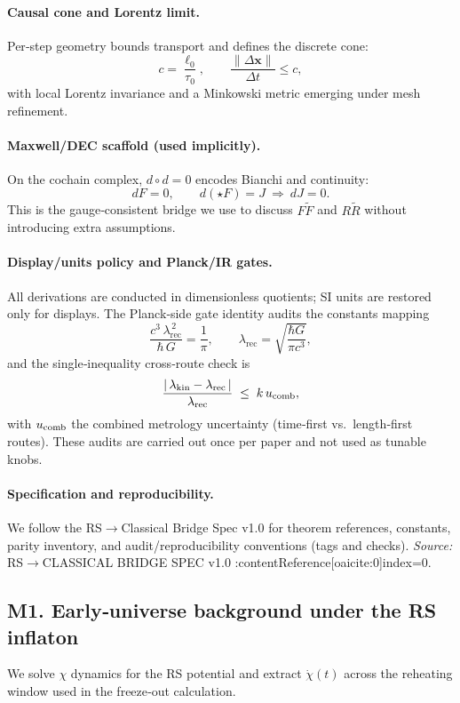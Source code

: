 \documentclass[11pt]{article}
\begin{document}
\paragraph{Causal cone and Lorentz limit.}
Per‑step geometry bounds transport and defines the discrete cone:
\[
  c=\frac{\ell_0}{\tau_0},\qquad \frac{\|\Delta\mathbf{x}\|}{\Delta t}\le c,
\]
with local Lorentz invariance and a Minkowski metric emerging under mesh refinement.

\paragraph{Maxwell/DEC scaffold (used implicitly).}
On the cochain complex, \(d\!\circ d=0\) encodes Bianchi and continuity:
\[
  dF=0,\qquad d(\star F)=J\ \Rightarrow\ dJ=0.
\]
This is the gauge‑consistent bridge we use to discuss \(F\tilde F\) and \(R\tilde R\) without introducing extra assumptions.

\paragraph{Display/units policy and Planck/IR gates.}
All derivations are conducted in dimensionless quotients; SI units are restored only for displays. The Planck‑side gate identity audits the constants mapping
\[
  \frac{c^3\,\lambda_{\mathrm{rec}}^{\,2}}{\hbar\,G}=\frac{1}{\pi},
\qquad
  \lambda_{\mathrm{rec}}=\sqrt{\frac{\hbar G}{\pi c^3}},
\]
and the single‑inequality cross‑route check is
\[
  \frac{|\,\lambda_{\rm kin}-\lambda_{\rm rec}\,|}{\lambda_{\rm rec}} \;\le\; k\,u_{\rm comb},
\]
with \(u_{\rm comb}\) the combined metrology uncertainty (time‑first vs.\ length‑first routes). These audits are carried out once per paper and not used as tunable knobs.

\paragraph{Specification and reproducibility.}
We follow the RS$\to$Classical Bridge Spec v1.0 for theorem references, constants, parity inventory, and audit/reproducibility conventions (tags and checks). \emph{Source:} RS$\to$CLASSICAL BRIDGE SPEC v1.0 :contentReference[oaicite:0]{index=0}.

\bigskip

\subsection*{M1. Early‑universe background under the RS inflaton}
We solve \(\chi\) dynamics for the RS potential and extract \(\dot\chi(t)\) across the reheating window used in the freeze‑out calculation.
\end{document}
